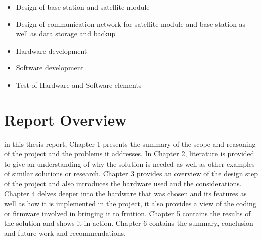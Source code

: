\begin{itemize}
	\item Design of base station and satellite module
	\item Design of communication network for satellite module and base station as well as data storage and backup
	\item Hardware development
	\item Software development
	\item Test of Hardware and Software elements
\end{itemize}

\section{Report Overview}%

in this thesis report, Chapter 1 presents the summary of the scope and reasoning of  the project and the problems it addresses. In Chapter 2, literature is provided to give an understanding of why the solution is needed as well as other examples of similar solutions or research. Chapter 3 provides an overview of the design step of the project and also introduces the hardware used and the considerations. Chapter 4 delves deeper into the hardware that was chosen and its features as well as how it is implemented in the project, it also provides a view of the coding or firmware involved in bringing it to fruition. Chapter 5 contains the results of the solution and shows it in action. Chapter 6 contains the summary, conclusion and future work and recommendations.






